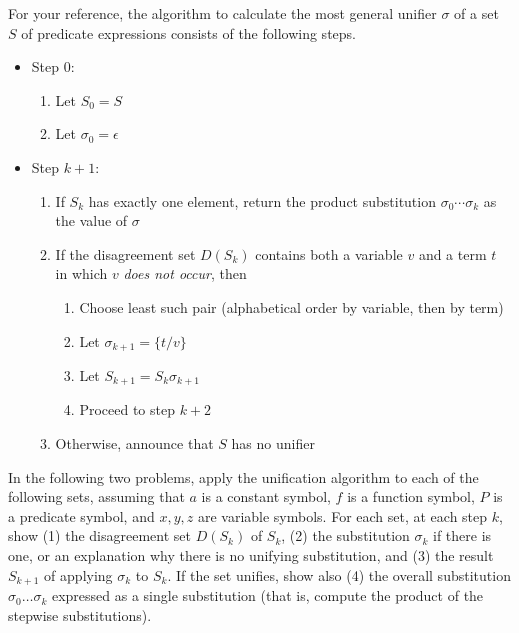 \documentclass{article}
\begin{document}
For your reference, the algorithm to calculate the most general
unifier $\sigma$ of a set $S$ of predicate expressions consists of the
following steps.
\begin{itemize}

\item Step 0:
  \begin{enumerate}
  \item Let $S_0 = S$
  \item Let $\sigma_0 = \epsilon$
  \end{enumerate}

\item Step $k+1$:
  \begin{enumerate}
  \item If $S_k$ has exactly one element, return the product
    substitution $\sigma_0\cdots\sigma_k$ as the value of $\sigma$
  \item If the disagreement set $D(S_k)$ contains both a variable
    $v$ and a term $t$ in which $v$ \emph{does not occur}, then
    \begin{enumerate}
    \item Choose least such pair (alphabetical order by variable, then
      by term)
    \item Let $\sigma_{k+1} = \{ t/v \}$
    \item Let $S_{k+1} = S_k \sigma_{k+1}$
    \item Proceed to step $k+2$
    \end{enumerate}
  \item Otherwise, announce that $S$ has no unifier
  \end{enumerate}
\end{itemize}

In the following two problems, apply the unification algorithm to each
of the following sets, assuming that $a$ is a constant symbol, $f$ is
a function symbol, $P$ is a predicate symbol, and $x,y,z$ are variable
symbols.  For each set, at each step $k$, show (1) the disagreement
set $D(S_k)$ of $S_k$, (2) the substitution $\sigma_k$ if there is
one, or an explanation why there is no unifying substitution, and (3)
the result $S_{k+1}$ of applying $\sigma_k$ to $S_k$.  If the set
unifies, show also (4) the overall substitution
$\sigma_0 \dots \sigma_k$ expressed as a single substitution (that is,
compute the product of the stepwise substitutions).
\end{document}
